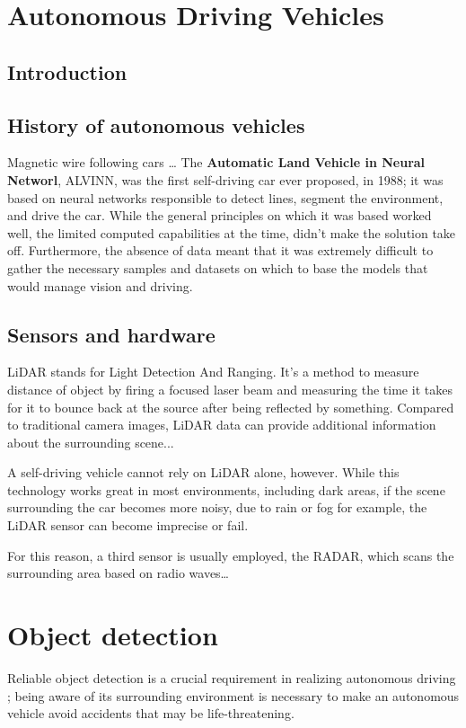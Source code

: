 \newpage
\section{Autonomous Driving Vehicles}
\subsection{Introduction}




\subsection{History of autonomous vehicles}
Magnetic wire following cars \dots
The \textbf{Automatic Land Vehicle in Neural Networl}, ALVINN, was the first self-driving car ever proposed, in 1988; it was based on neural networks responsible to detect lines, segment the environment, and drive the car.
While the general principles on which it was based worked well, the limited computed capabilities at the time, didn't make the solution take off. Furthermore, the absence of data meant that it was extremely difficult to gather the necessary samples and datasets on which to base the models that would manage vision and driving.


\subsection{Sensors and hardware}
LiDAR stands for Light Detection And Ranging. It's a method to measure distance of object by firing a focused laser beam and measuring the time it takes for it to bounce back at the source after being reflected by something.
Compared to traditional camera images, LiDAR data can provide additional information about the surrounding scene...

A self-driving vehicle cannot rely on LiDAR alone, however. While this technology works great in most environments, including dark areas, if the scene surrounding the car becomes more noisy, due to rain or fog for example, the LiDAR sensor can become imprecise or fail.

For this reason, a third sensor is usually employed, the RADAR, which scans the surrounding area based on radio waves\dots





\section{Object detection}
Reliable object detection is a crucial requirement in realizing autonomous driving \cite{DBLP:journals/ftcgv/JanaiGBG20}; being aware of its surrounding environment is necessary to make an autonomous vehicle avoid accidents that may be life-threatening.

